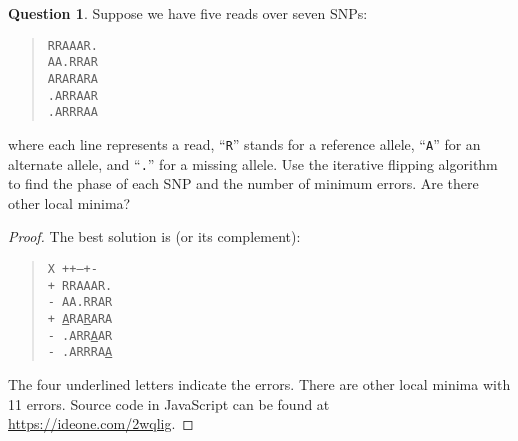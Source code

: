\documentclass{article}[10pt]
\theoremstyle{definition}\newtheorem{question}{Question}
\begin{document}
\begin{question}
Suppose we have five reads over seven SNPs:
\begin{quote}
\tt RRAAAR.\\
\tt AA.RRAR\\
\tt ARARARA\\
\tt .ARRAAR\\
\tt .ARRRAA
\end{quote}
where each line represents a read, ``{\tt R}'' stands for a reference allele,
``{\tt A}'' for an alternate allele, and ``{\tt .}'' for a missing allele. Use
the iterative flipping algorithm to find the phase of each SNP and the number
of minimum errors. Are there other local minima?
\end{question}

\begin{proof}
The best solution is (or its complement):
\begin{quote}
\tt X ++---+-\\
\tt + RRAAAR.\\
\tt - AA.RRAR\\
\tt + \underline{A}RA\underline{R}ARA\\
\tt - .ARR\underline{A}AR\\
\tt - .ARRRA\underline{A}
\end{quote}
The four underlined letters indicate the errors. There are other local minima
with 11 errors. Source code in JavaScript can be found at
\href{https://ideone.com/2wqlig}{https://ideone.com/2wqlig}.
\end{proof}
\end{document}
